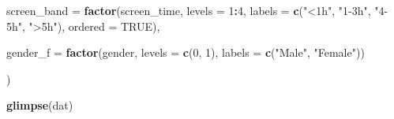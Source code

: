 \documentclass[
]{article}
\newenvironment{Shaded}{\begin{snugshade}}{\end{snugshade}}
\newcommand{\AttributeTok}[1]{\textcolor[rgb]{0.13,0.29,0.53}{#1}}
\newcommand{\ConstantTok}[1]{\textcolor[rgb]{0.56,0.35,0.01}{#1}}
\newcommand{\DecValTok}[1]{\textcolor[rgb]{0.00,0.00,0.81}{#1}}
\newcommand{\FunctionTok}[1]{\textcolor[rgb]{0.13,0.29,0.53}{\textbf{#1}}}
\newcommand{\NormalTok}[1]{#1}
\newcommand{\SpecialCharTok}[1]{\textcolor[rgb]{0.81,0.36,0.00}{\textbf{#1}}}
\newcommand{\StringTok}[1]{\textcolor[rgb]{0.31,0.60,0.02}{#1}}
\begin{document}
\begin{Shaded}
\begin{Highlighting}[]
    \AttributeTok{screen\_band =} \FunctionTok{factor}\NormalTok{(screen\_time, }\AttributeTok{levels =} \DecValTok{1}\SpecialCharTok{:}\DecValTok{4}\NormalTok{,}
                         \AttributeTok{labels =} \FunctionTok{c}\NormalTok{(}\StringTok{"\textless{}1h"}\NormalTok{, }\StringTok{"1{-}3h"}\NormalTok{, }\StringTok{"4{-}5h"}\NormalTok{, }\StringTok{"\textgreater{}5h"}\NormalTok{),}
                         \AttributeTok{ordered =} \ConstantTok{TRUE}\NormalTok{),}
    
    \AttributeTok{gender\_f    =} \FunctionTok{factor}\NormalTok{(gender, }\AttributeTok{levels =} \FunctionTok{c}\NormalTok{(}\DecValTok{0}\NormalTok{, }\DecValTok{1}\NormalTok{), }
                         \AttributeTok{labels =} \FunctionTok{c}\NormalTok{(}\StringTok{"Male"}\NormalTok{, }\StringTok{"Female"}\NormalTok{))}
    
\NormalTok{  ) }

\FunctionTok{glimpse}\NormalTok{(dat)}
\end{Highlighting}
\end{Shaded}
\end{document}
